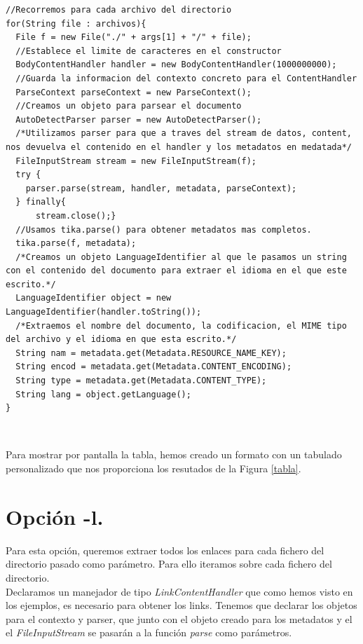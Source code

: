 \documentclass[12pt]{article}
\begin{document}
\begin{lstlisting}
//Recorremos para cada archivo del directorio
for(String file : archivos){
  File f = new File("./" + args[1] + "/" + file);
  //Establece el limite de caracteres en el constructor
  BodyContentHandler handler = new BodyContentHandler(1000000000);
  //Guarda la informacion del contexto concreto para el ContentHandler
  ParseContext parseContext = new ParseContext();
  //Creamos un objeto para parsear el documento
  AutoDetectParser parser = new AutoDetectParser();
  /*Utilizamos parser para que a traves del stream de datos, content, nos devuelva el contenido en el handler y los metadatos en medatada*/
  FileInputStream stream = new FileInputStream(f);
  try {
    parser.parse(stream, handler, metadata, parseContext);
  } finally{
      stream.close();}
  //Usamos tika.parse() para obtener metadatos mas completos.
  tika.parse(f, metadata);
  /*Creamos un objeto LanguageIdentifier al que le pasamos un string con el contenido del documento para extraer el idioma en el que este escrito.*/
  LanguageIdentifier object = new LanguageIdentifier(handler.toString());
  /*Extraemos el nombre del documento, la codificacion, el MIME tipo del archivo y el idioma en que esta escrito.*/
  String nam = metadata.get(Metadata.RESOURCE_NAME_KEY);
  String encod = metadata.get(Metadata.CONTENT_ENCODING);
  String type = metadata.get(Metadata.CONTENT_TYPE);
  String lang = object.getLanguage();
}
\end{lstlisting}\

Para mostrar por pantalla la tabla, hemos creado un formato con un tabulado personalizado que nos proporciona los resutados de la Figura \ref{tabla}.

\section{Opción \textbf{-l}.}

Para esta opción, queremos extraer todos los enlaces para cada fichero del directorio pasado como parámetro. Para ello iteramos sobre cada fichero del directorio.\\

Declaramos un manejador de tipo \textit{LinkContentHandler} que como hemos visto en los ejemplos, es necesario para obtener los links. \cite{tika} Tenemos que declarar los objetos para el contexto y parser, que junto con el objeto creado para los metadatos y el el \textit{FileInputStream} se pasarán a la función \textit{parse} como parámetros.\\
\end{document}
